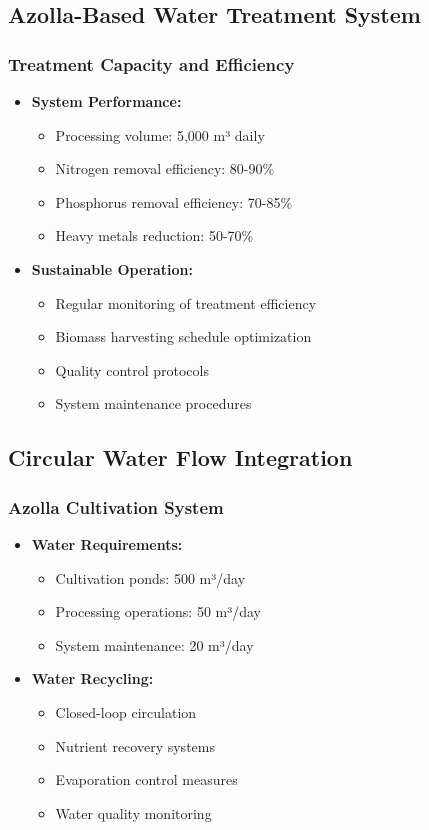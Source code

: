 \subsection{Azolla-Based Water Treatment System}

\subsubsection{Treatment Capacity and Efficiency}
\begin{itemize}
    \item \textbf{System Performance:}
    \begin{itemize}
        \item Processing volume: 5,000 m³ daily
        \item Nitrogen removal efficiency: 80-90\%
        \item Phosphorus removal efficiency: 70-85\%
        \item Heavy metals reduction: 50-70\%
    \end{itemize}
    
    \item \textbf{Sustainable Operation:}
    \begin{itemize}
        \item Regular monitoring of treatment efficiency
        \item Biomass harvesting schedule optimization
        \item Quality control protocols
        \item System maintenance procedures
    \end{itemize}
\end{itemize}

\subsection{Circular Water Flow Integration}

\subsubsection{Azolla Cultivation System}
\begin{itemize}
    \item \textbf{Water Requirements:}
    \begin{itemize}
        \item Cultivation ponds: 500 m³/day
        \item Processing operations: 50 m³/day
        \item System maintenance: 20 m³/day
    \end{itemize}
    
    \item \textbf{Water Recycling:}
    \begin{itemize}
        \item Closed-loop circulation
        \item Nutrient recovery systems
        \item Evaporation control measures
        \item Water quality monitoring
    \end{itemize}
\end{itemize}

